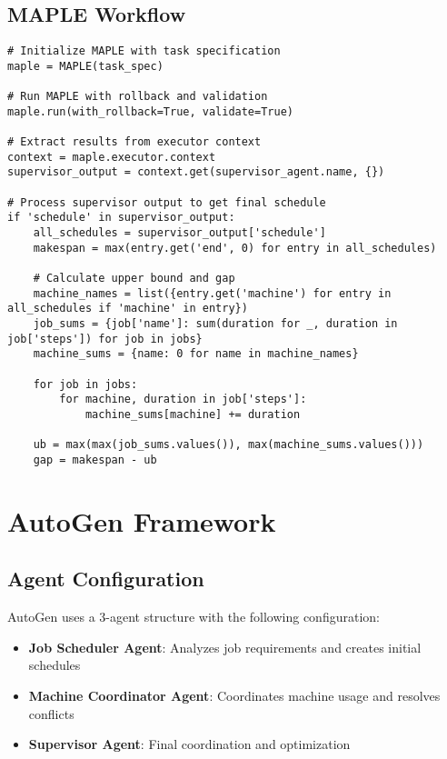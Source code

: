 \documentclass[11pt]{article}
\begin{document}
\subsection{MAPLE Workflow}

\begin{lstlisting}[caption=MAPLE Execution Workflow]
# Initialize MAPLE with task specification
maple = MAPLE(task_spec)

# Run MAPLE with rollback and validation
maple.run(with_rollback=True, validate=True)

# Extract results from executor context
context = maple.executor.context
supervisor_output = context.get(supervisor_agent.name, {})

# Process supervisor output to get final schedule
if 'schedule' in supervisor_output:
    all_schedules = supervisor_output['schedule']
    makespan = max(entry.get('end', 0) for entry in all_schedules)
    
    # Calculate upper bound and gap
    machine_names = list({entry.get('machine') for entry in all_schedules if 'machine' in entry})
    job_sums = {job['name']: sum(duration for _, duration in job['steps']) for job in jobs}
    machine_sums = {name: 0 for name in machine_names}
    
    for job in jobs:
        for machine, duration in job['steps']:
            machine_sums[machine] += duration
    
    ub = max(max(job_sums.values()), max(machine_sums.values()))
    gap = makespan - ub
\end{lstlisting}

\section{AutoGen Framework}

\subsection{Agent Configuration}

AutoGen uses a 3-agent structure with the following configuration:

\begin{itemize}
    \item \textbf{Job Scheduler Agent}: Analyzes job requirements and creates initial schedules
    \item \textbf{Machine Coordinator Agent}: Coordinates machine usage and resolves conflicts
    \item \textbf{Supervisor Agent}: Final coordination and optimization
\end{itemize}
\end{document}
